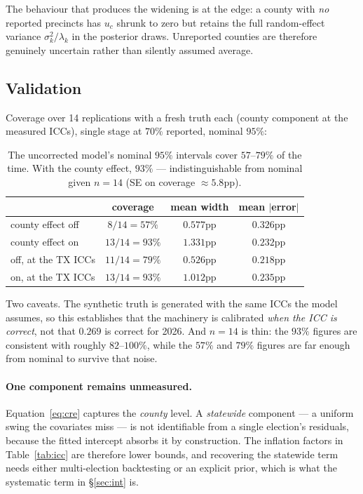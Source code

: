 \documentclass[11pt]{article}
\begin{document}
The behaviour that produces the widening is at the edge: a county with \emph{no} reported
precincts has $u_c$ shrunk to zero but retains the full random-effect variance
$\sigma_k^2/\lambda_k$ in the posterior draws. Unreported counties are therefore
genuinely uncertain rather than silently assumed average.

\subsection{Validation}

Coverage over 14 replications with a fresh truth each (county component at the measured
ICCs), single stage at $70\%$ reported, nominal $95\%$:

\begin{table}[ht]
\centering
\small
\begin{tabular}{@{}lccc@{}}
\toprule
 & coverage & mean width & mean $|$error$|$ \\
\midrule
county effect off & $8/14 = 57\%$ & $0.577$pp & $0.326$pp \\
county effect on  & $13/14 = 93\%$ & $1.331$pp & $0.232$pp \\
\midrule
off, at the TX ICCs & $11/14 = 79\%$ & $0.526$pp & $0.218$pp \\
on, at the TX ICCs  & $13/14 = 93\%$ & $1.012$pp & $0.235$pp \\
\bottomrule
\end{tabular}
\caption{The uncorrected model's nominal $95\%$ intervals cover $57$--$79\%$ of the time.
With the county effect, $93\%$ --- indistinguishable from nominal given $n=14$ (SE on
coverage $\approx 5.8$pp).}
\label{tab:cov}
\end{table}

\noindent Two caveats. The synthetic truth is generated with the same ICCs the model
assumes, so this establishes that the machinery is calibrated \emph{when the ICC is
correct}, not that $0.269$ is correct for 2026. And $n=14$ is thin: the $93\%$ figures are
consistent with roughly $82$--$100\%$, while the $57\%$ and $79\%$ figures are far enough
from nominal to survive that noise.

\paragraph{One component remains unmeasured.} Equation~\eqref{eq:cre} captures the
\emph{county} level. A \emph{statewide} component --- a uniform swing the covariates miss
--- is not identifiable from a single election's residuals, because the fitted intercept
absorbs it by construction. The inflation factors in Table~\ref{tab:icc} are therefore
lower bounds, and recovering the statewide term needs either multi-election backtesting or
an explicit prior, which is what the systematic term in \S\ref{sec:int} is.
\end{document}
